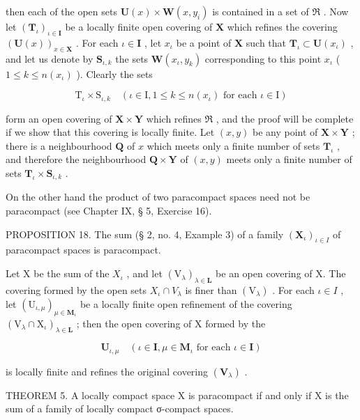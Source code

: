then each of the open sets \(\mathbf{U}(x) \times \mathbf{W}(x, y_i)\) is contained in a set of \(\Re\) . Now let \((\mathbf{T}_{\iota})_{\iota \in \mathbf{I}}\) be a locally finite open covering of \(\mathbf{X}\) which refines the covering \((\mathbf{U}(x))_{x \in \mathbf{X}}\) . For each \(\iota \in \mathbf{I}\) , let \(x_{\iota}\) be a point of \(\mathbf{X}\) such that \(\mathbf{T}_{\iota} \subset \mathbf{U}(x_{\iota})\) , and let us denote by \(\mathbf{S}_{\iota,k}\) the sets \(\mathbf{W}(x_{\iota}, y_k)\) corresponding to this point \(x_{\iota}\) ( \(1 \leqslant k \leqslant n(x_{\iota})\) ). Clearly the sets

\[
\mathrm{T} _ {\iota} \times \mathrm{S} _ {\iota, k} \quad (\iota \in \mathrm{I}, 1 \leqslant k \leqslant n (x _ {\iota}) \text {   for   each   } \iota \in \mathrm{I})
\]

form an open covering of \(\mathbf{X} \times \mathbf{Y}\) which refines \(\Re\) , and the proof will be complete if we show that this covering is locally finite. Let \((x, y)\) be any point of \(\mathbf{X} \times \mathbf{Y}\) ; there is a neighbourhood \(\mathbf{Q}\) of \(x\) which meets only a finite number of sets \(\mathbf{T}_{\iota}\) , and therefore the neighbourhood \(\mathbf{Q} \times \mathbf{Y}\) of \((x, y)\) meets only a finite number of sets \(\mathbf{T}_{\iota} \times \mathbf{S}_{\iota,k}\) .

On the other hand the product of two paracompact spaces need not be paracompact (see Chapter IX, § 5, Exercise 16).

PROPOSITION 18. The sum (§ 2, no. 4, Example 3) of a family \((\mathbf{X}_{\iota})_{\iota\in I}\) of paracompact spaces is paracompact.

Let X be the sum of the \(X_{\iota}\) , and let \((\mathrm{V}_{\lambda})_{\lambda\in\mathbf{L}}\) be an open covering of X. The covering formed by the open sets \(X_{\iota}\cap V_{\lambda}\) is finer than \((\mathrm{V}_{\lambda})\) . For each \(\iota\in I\) , let \((\mathrm{U}_{\iota,\mu})_{\mu\in\mathbf{M}_{\iota}}\) be a locally finite open refinement of the covering \((\mathrm{V}_{\lambda}\cap\mathrm{X}_{\iota})_{\lambda\in\mathbf{L}}\) ; then the open covering of X formed by the

\[
\mathbf {U} _ {\iota , \mu} \quad (\iota \in \mathbf {I}, \mu \in \mathbf {M} _ {\iota} \text {   for   each   } \iota \in \mathbf {I})
\]

is locally finite and refines the original covering \((\mathbf{V}_{\lambda})\) .

THEOREM 5. A locally compact space X is paracompact if and only if X is the sum of a family of locally compact σ-compact spaces.

